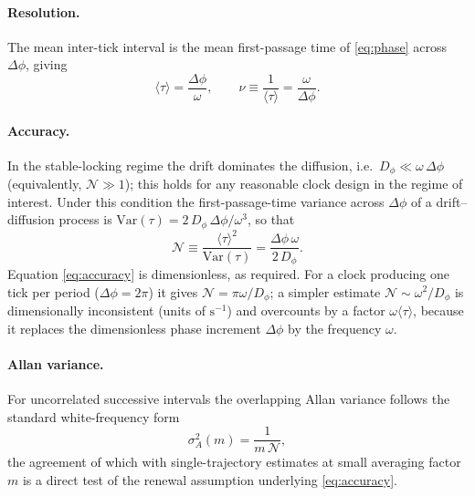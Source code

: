 \documentclass[aps,pre,reprint,amsmath,amssymb,floatfix,nofootinbib]{revtex4-2}
\newcommand{\avg}[1]{\langle #1 \rangle}
\newcommand{\Dphi}{D_{\phi}}
\begin{document}
\paragraph*{Resolution.}
The mean inter-tick interval is the mean first-passage time of
\eqref{eq:phase} across $\Delta\phi$, giving
\begin{equation}
  \avg{\tau} = \frac{\Delta\phi}{\omega},
  \qquad
  \nu \equiv \frac{1}{\avg{\tau}} = \frac{\omega}{\Delta\phi}.
  \label{eq:resolution}
\end{equation}

\paragraph*{Accuracy.}
In the stable-locking regime the drift dominates the diffusion, i.e.\
$\Dphi \ll \omega\,\Delta\phi$ (equivalently, $\mathcal{N}\gg1$); this
holds for any reasonable clock design in the regime of interest.
Under this condition the first-passage-time variance across $\Delta\phi$
of a drift--diffusion process is
$\mathrm{Var}(\tau)=2\,\Dphi\,\Delta\phi/\omega^{3}$, so that
\begin{equation}
  \boxed{\;
  \mathcal{N} \equiv \frac{\avg{\tau}^2}{\mathrm{Var}(\tau)}
  = \frac{\Delta\phi\,\omega}{2\,\Dphi}.
  \;}
  \label{eq:accuracy}
\end{equation}
Equation \eqref{eq:accuracy} is dimensionless, as required. For a clock
producing one tick per period ($\Delta\phi=2\pi$) it gives
$\mathcal{N}=\pi\omega/\Dphi$; a simpler estimate
$\mathcal{N}\sim\omega^2/\Dphi$ is dimensionally inconsistent
(units of $\mathrm{s}^{-1}$) and overcounts by a factor $\omega\avg{\tau}$,
because it replaces the dimensionless phase increment $\Delta\phi$ by the
frequency $\omega$.

\paragraph*{Allan variance.}
For uncorrelated successive intervals the overlapping Allan variance
follows the standard white-frequency form~\cite{Allan1966}
\begin{equation}
  \sigma_A^2(m) = \frac{1}{m\,\mathcal{N}},
  \label{eq:allan}
\end{equation}
the agreement of which with single-trajectory estimates at small averaging
factor $m$ is a direct test of the renewal assumption underlying
\eqref{eq:accuracy}.
\end{document}
